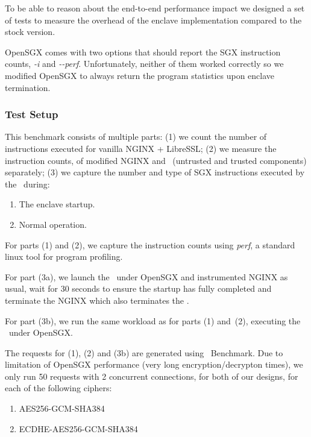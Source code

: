 \documentclass[../../../main.tex]{subfiles}
\begin{document}
\label{sec:cpu-instr-analysis}
To be able to reason about the end-to-end performance impact we designed a set
of tests to measure the overhead of the enclave implementation compared to the
stock version.


OpenSGX comes with two options that should report the SGX instruction counts,
\textit{-i} and \textit{-{}-perf}. Unfortunately, neither of them worked
correctly so we modified OpenSGX to always return the program statistics upon
enclave termination.

\subsubsection*{Test Setup}
This benchmark consists of multiple parts: (1) we count the number of
instructions executed for vanilla NGINX + LibreSSL; (2) we measure the
instruction counts, of modified NGINX and \enclavemodel~(untrusted and trusted
components) separately; (3) we capture the number and type of SGX instructions
executed by the \enclaveprogram~during:
\begin{enumerate}
  \item The enclave startup.
  \item Normal operation.
\end{enumerate}

For parts (1) and (2), we capture the instruction counts using \textit{perf},
a standard linux tool for program profiling.

For part (3a), we launch the \enclaveprogram~under OpenSGX and instrumented
NGINX as usual, wait for 30 seconds to ensure the startup has fully completed
and terminate the NGINX which also terminates the \enclaveprogram.

For part (3b), we run the same workload as for parts (1) and~(2), executing
the \enclaveprogram~under OpenSGX.

The requests for (1), (2) and (3b) are generated using \Apache~Benchmark. Due
to limitation of OpenSGX performance (very long encryption/decrypton times),
we only run 50 requests with 2 concurrent connections, for both of our
designs, for each of the following ciphers:
\begin{enumerate}
  \item AES256-GCM-SHA384
  \item ECDHE-AES256-GCM-SHA384
\end{enumerate}
\end{document}
